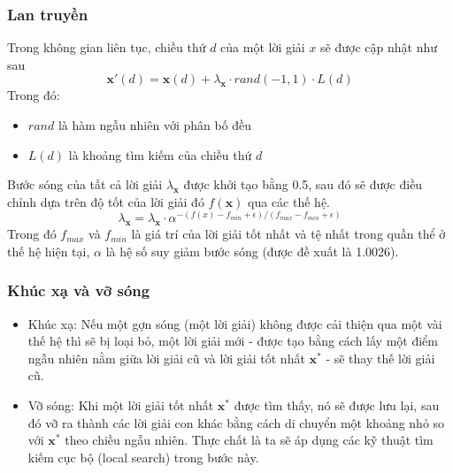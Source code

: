 \begin{frame}
    \frametitle{Lan truyền}
    \label{frame:propagation}
    Trong không gian liên tục, chiều thứ $d$ của một lời giải $x$ sẽ được cập nhật như sau
    \begin{equation}
        \label{eq:e1}
            \mathbf{x}'(d) = \mathbf{x}(d) + \lambda_\mathbf{x} \cdot rand(-1, 1) \cdot L(d)
    \end{equation}
    Trong đó:
    \begin{itemize}
        \item $rand$ là hàm ngẫu nhiên với phân bố đều
        \item $L(d)$ là khoảng tìm kiếm của chiều thứ $d$
    \end{itemize}
    Bước sóng của tất cả lời giải $\lambda_{\mathbf{x}}$ được khởi tạo bằng 0.5, sau đó sẽ được điều chỉnh dựa trên độ tốt của lời giải đó $f(\mathbf{x})$ qua các thế hệ. 
    \begin{equation}
        \label{eq:e2}
        \lambda_\mathbf{x} = \lambda_\mathbf{x}\cdot\alpha^{-(f(x) - f_{min} + \epsilon)/(f_{max} - f_{min} + \epsilon)}
    \end{equation}
    Trong đó $f_{max}$ và $f_{min}$ là giá trí của lời giải tốt nhất và tệ nhất trong quần thể ở thế hệ hiện tại, $\alpha$ là hệ số suy giảm bước sóng (được đề xuất là 1.0026)\cite{zheng2019water}.
\end{frame}

\begin{frame}
    \frametitle{Khúc xạ và vỡ sóng}
    \begin{itemize}
        \item Khúc xạ: Nếu một gợn sóng (một lời giải) không được cải thiện qua một vài thế hệ thì sẽ bị loại bỏ, một lời giải mới - được tạo bằng cách lấy một điểm ngẫu nhiên nằm giữa lời giải cũ và lời giải tốt nhất $\mathbf{x^*}$ - sẽ thay thế lời giải cũ.
        \item Vỡ sóng: Khi một lời giải tốt nhất $\mathbf{x^*}$ được tìm thấy, nó sẽ được lưu lại, sau đó vỡ ra thành các lời giải con khác bằng cách di chuyển một khoảng nhỏ so với $\mathbf{x^*}$ theo chiều ngẫu nhiên. Thực chất là ta sẽ áp dụng các kỹ thuật tìm kiếm cục bộ (local search) trong bước này.
    \end{itemize}
\end{frame}